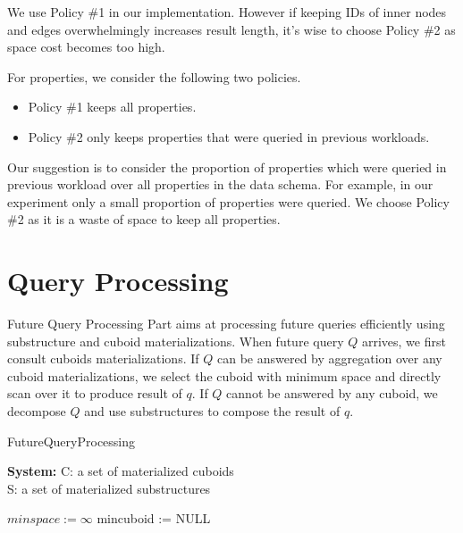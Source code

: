 We use Policy \#1 in our implementation. However if keeping IDs of inner nodes and edges overwhelmingly increases result length, it's wise to choose Policy \#2 as space cost becomes too high. 

For properties, we consider the following two policies.

\begin{itemize}
\item Policy \#1 keeps all properties.
\item Policy \#2 only keeps properties that were queried in previous workloads.
\end{itemize}

Our suggestion is to consider the proportion of properties which were queried in previous workload over all properties in the data schema. For example, in our experiment only a small proportion of properties were queried. We choose Policy \#2 as it is a waste of space to keep all properties. 


\section{Query Processing}
\label{Future Query Processing Part}
Future Query Processing Part aims at processing future queries efficiently using substructure and cuboid materializations. When future query $Q$ arrives, we first consult cuboids materializations. If $Q$ can be answered by aggregation over any cuboid materializations, we select the cuboid with minimum space and directly scan over it to produce result of $q$. If $Q$ cannot be answered by any cuboid, we decompose $Q$ and use substructures to compose the result of $q$. 

\begin{algorithm}[H]
\caption{FutureQueryProcessing}
\LinesNumbered
\textbf{System:} C: a set of materialized cuboids\\ S: a set of materialized substructures\\ 

$minspace:= \infty $\;
mincuboid := NULL\;
\end{algorithm}
\clearpage

